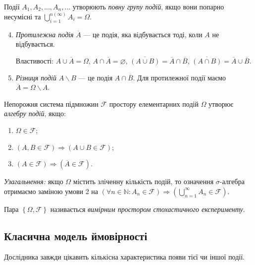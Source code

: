 \begin{definition}
    Події $A_1, A_2, ..., A_n, ...$ утворюють \emph{повну групу подій}, якщо вони попарно несумісні 
    та $\bigcup\limits_{i=1}^{n \left( \infty \right)} A_i = \Omega$.
\end{definition}
\begin{enumerate}
    \setcounter{enumi}{3}
    \item \emph{Протилежна подія} $\overline{A}$ --- це подія, яка відбувається тоді, коли $A$ не відбувається.
    
    Властивості: $A \cup \overline{A} = \Omega$, $A \cap \overline{A} = \varnothing$, $\overline{\left( A \cup B \right)} = \overline{A} \cap \overline{B}$,
    $\overline{\left( A \cap B \right)} = \overline{A} \cup \overline{B}$.
    \item \emph{Різниця подій} $A \backslash B$ --- це подія $A \cap \overline{B}$. Для протилежної події маємо $\overline{A} =  \Omega \backslash A$.
\end{enumerate}

\begin{definition}
    Непорожня система підмножин $\mathcal{F}$ простору елементарних подій $\Omega$ утворює \emph{алгебру подій}, якщо:
    \begin{enumerate}
        \item $\Omega \in \mathcal{F}$;
        \item $\left( A, B \in \mathcal{F}\right) \Rightarrow \left( A \cup B \in \mathcal{F}\right)$;
        \item $\left( A \in \mathcal{F}\right) \Rightarrow \left( \overline{A} \in \mathcal{F}\right)$.
    \end{enumerate}
    \emph{Узагальнення:} якщо $\Omega$ містить зліченну кількість подій, то означення $\sigma$-алгебра отримаємо заміною умови
    2 на $\left(\forall n \in \mathbb{N}: A_n \in \mathcal{F} \right) \Rightarrow \left( \bigcup\limits_{n=1}^{\infty} A_n \in \mathcal{F}\right)$.
    
    Пара $\left\{\Omega, \mathcal{F}\right\}$ називається \emph{вимірним простором стохастичного експерименту}.
\end{definition}

\subsection{Класична модель ймовірності}
Дослідника завжди цікавить кількісна характеристика появи тієї чи іншої події.

